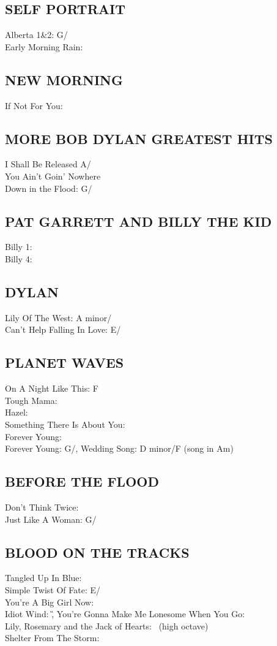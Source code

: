 \begin{articlelayout}
\subsection{SELF PORTRAIT}
Alberta 1\&2: G/\C\\ Early Morning Rain: \C


\subsection{NEW MORNING}
If Not For You: \E


\subsection{MORE BOB DYLAN GREATEST HITS}
I Shall Be Released A/\D\\
You Ain't Goin' Nowhere \G\\
Down in the Flood: G/\C


\subsection{PAT GARRETT AND BILLY THE KID}
Billy 1: \G\\ Billy 4: \A


\subsection{DYLAN}
Lily Of The West: A minor/\C\\ Can't Help Falling In Love:
E/\A


\subsection{PLANET WAVES}
On A Night Like This: F\\ Tough Mama: \D\\ Hazel: \E\\ Something There Is About You: \G\\ Forever Young: \D\\ Forever Young: G/\C,
Wedding Song: D minor/F (song in Am)


\subsection{BEFORE THE FLOOD}
Don't Think Twice: \C\\ Just Like A Woman: G/\C


\subsection{BLOOD ON THE TRACKS}
Tangled Up In Blue: \A\\ Simple Twist Of Fate: E/\A\\ You're A Big Girl Now: \G\\ Idiot Wind: \G,
You're Gonna Make Me Lonesome When You Go: \E\\ Lily, Rosemary and the Jack of Hearts: \D\ (high octave)\\ Shelter From The Storm: \E



\end{articlelayout}
